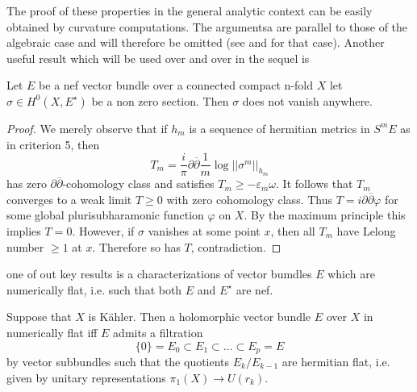 The proof of these properties in the general analytic context can be easily obtained by curvature computations. The argumentsa are parallel to those of the algebraic case and will therefore be omitted (see \cite{art5-keyHa66} and \cite{art5-keyCP91} for that case). Another useful result which will be used over and over in the sequel is

\begin{prop}\label{art5-prop-1.7}
Let $E$ be a nef vector bundle over a connected compact n-fold $X$ let $\sigma \in H^{0}(X, E^{\star})$ be a non zero section. Then $\sigma$ does not vanish anywhere.
\end{prop}

\begin{proof}
We merely observe that if $h_{m}$ is a sequence of hermitian metrics in $S^{m}E$ as in criterion 5, then
$$
T_{m}=\dfrac{i}{\pi} \partial\overline{\partial} \dfrac{1}{m}\log||\sigma^{m}||_{h_{m}}
$$
has zero $\partial\overline{\partial}$-cohomology class and satisfies $T_{m}\geq -\varepsilon_{m}\omega$. It follows that $T_{m}$ converges to a weak limit $T\geq 0$ with zero cohomology class. Thus $T= i\partial\overline{\partial}\varphi$ for some global plurisubharamonic function $\varphi$ on $X$. By the maximum principle this implies $T=0$. However, if $\sigma$ vanishes at some point $x$, then all $T_{m}$ have Lelong number $\geq 1$ at $x$. Therefore so has $T$, contradiction.
\end{proof}

one of out key results is a characterizations of vector bumdles $E$ which are numerically flat, i.e. such that both $E$ and $E^{\star}$ are nef.

\begin{theorem}\label{art5-thm-1.8}
Suppose that $X$ is K\"ahler. Then a holomorphic vector bundle $E$ over $X$ in numerically flat iff $E$ admits a filtration
$$
\{0 \} = E_{0}\subset E_{1}\subset \ldots \subset E_{p} = E
$$
by vector subbundles such that the quotients $E_{k}/E_{k-1}$ are hermitian flat, i.e. given by unitary representations $\pi_{1}(X) \rightarrow U(r_{k})$.
\end{theorem}

